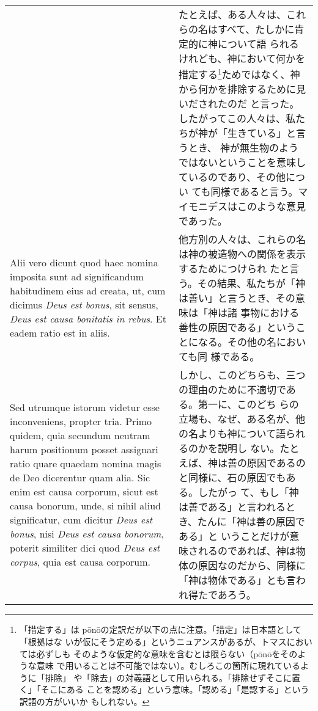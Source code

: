 \documentclass[paper=a4paper,fontsize=10pt,jafontsize=9pt,titlepage]{jlreq}
\begin{document}
\begin{longtable}{p{21em}p{21em}}
&

たとえば、ある人々は、これらの名はすべて、たしかに肯定的に神について語
られるけれども、神において何かを措定する\footnote{「措定する」は
p\={o}n\={o}の定訳だが以下の点に注意。「措定」は日本語として「根拠はな
いが仮にそう定める」というニュアンスがあるが、トマスにおいては必ずしも
そのような仮定的な意味を含むとは限らない（p\={o}n\={o}をそのような意味
で用いることは不可能ではない）。むしろこの箇所に現れているように「排除」
や「除去」の対義語として用いられる。「排除せずそこに置く」「そこにある
ことを認める」という意味。「認める」「是認する」という訳語の方がいいか
もしれない。}ためではなく、神から何かを排除するために見いだされたのだ
と言った。したがってこの人々は、私たちが神が「生きている」と言うとき、
神が無生物のようではないということを意味しているのであり、その他につい
ても同様であると言う。マイモニデスはこのような意見であった。

\\

Alii vero dicunt quod haec nomina imposita sunt ad significandum
habitudinem eius ad creata, ut, cum dicimus {\itshape Deus est bonus}, sit
sensus, {\itshape Deus est causa bonitatis in rebus}. Et eadem ratio est in
aliis.

&

他方別の人々は、これらの名は神の被造物への関係を表示するためにつけられ
たと言う。その結果、私たちが「神は善い」と言うとき、その意味は「神は諸
事物における善性の原因である」ということになる。その他の名においても同
様である。

\\

Sed utrumque istorum videtur esse inconveniens, propter tria. Primo
quidem, quia secundum neutram harum positionum posset assignari ratio
quare quaedam nomina magis de Deo dicerentur quam alia. Sic enim est
causa corporum, sicut est causa bonorum, unde, si nihil aliud
significatur, cum dicitur {\itshape Deus est bonus}, nisi {\itshape Deus est
causa bonorum}, poterit similiter dici quod {\itshape Deus est corpus},
quia est causa corporum.

&

しかし、このどちらも、三つの理由のために不適切である。第一に、このどち
らの立場も、なぜ、ある名が、他の名よりも神について語られるのかを説明し
ない。たとえば、神は善の原因であるのと同様に、石の原因でもある。したがっ
て、もし「神は善である」と言われるとき、たんに「神は善の原因である」と
いうことだけが意味されるのであれば、神は物体の原因なのだから、同様に
「神は物体である」とも言われ得たであろう。


\end{longtable}
\end{document}
